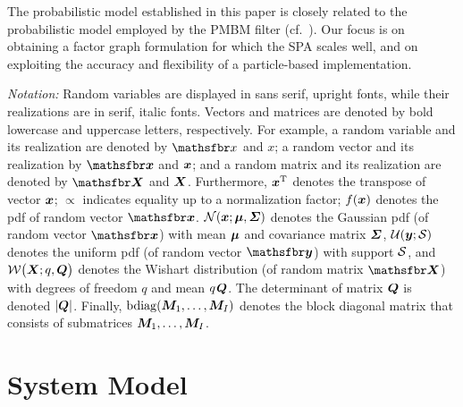 \documentclass[10pt, twoside, romanappendices]{IEEEtran}
\providecommand{\ist}{\hspace*{.3mm}}
\begin{document}
The probabilistic model established in this paper is closely related to the probabilistic model employed by the PMBM filter (cf.~\cite{MeyKroWilLauHlaBraWin:J18}). Our focus is on obtaining a factor graph formulation for which the SPA scales well, and on exploiting the accuracy and flexibility of a particle-based implementation.


\emph{Notation:} Random variables are displayed in sans serif, upright fonts, while their realizations are in serif, italic fonts. 
Vectors and matrices are denoted by bold lowercase and uppercase letters, respectively. For example, a random variable and its realization are denoted by $\rv x$ and $x$; a random vector and its realization 
by $\RV x$ and $\bm{x}$; and a random matrix and its realization are denoted by $\RM{X}$ and $\M{X}$. 
Furthermore, ${\bm{x}}^{\text T}$ denotes the transpose of vector $\bm{x}$; 
$\propto$ indicates equality up to a normalization factor;
$f(\bm{x})$ denotes the \ac{pdf} of 
random  vector $\RV{x}$. $\Set{N}(\V{x}; \V{\mu},\M{\Sigma})$ denotes the Gaussian \ac{pdf}  (of random vector $\RV{x}$) with mean $\bm{\mu}$ and covariance \vspace{0mm} matrix $\M{\Sigma}$, $\Set{U}(\V{y}; \Set{S})$ denotes the uniform \ac{pdf}   (of random vector $\RV{y}$) with support $\Set{S}$, and $\Set{W}\big(\M{X}; q, \M{Q} \big)$  denotes the Wishart distribution (of random matrix $\RM{X}$) with degrees of freedom $q$ and mean $q \ist \M{Q}$. The determinant of matrix $\M{Q}$ is denoted $|\M{Q}|$. Finally, $\mathrm{bdiag}(\M{M}_1, \dots, \M{M}_I)$ denotes the block diagonal matrix that consists of submatrices\vspace{0mm} $\M{M}_1, \dots, \M{M}_I$.



\section{System Model \vspace{-0mm} }
\label{sec:systemModel}
\end{document}
